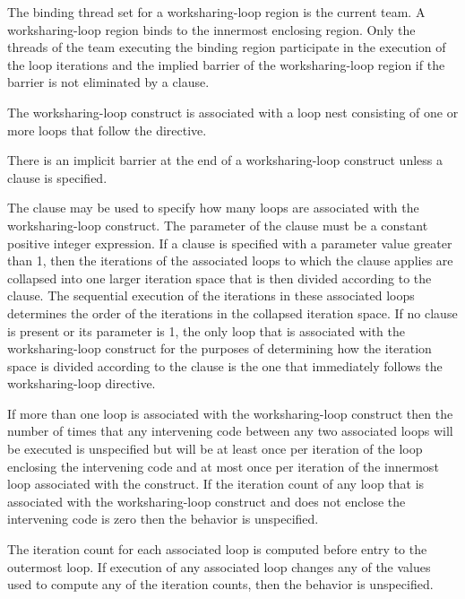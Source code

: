 \binding
The binding thread set for a worksharing-loop region is the current team. A
worksharing-loop region binds to the
innermost enclosing  region. Only the threads of the team executing the
binding  region participate in the execution of the loop iterations and the
implied barrier of the worksharing-loop region if the barrier is not eliminated by a  clause.

\descr
The worksharing-loop construct is associated with a loop nest consisting of one or more loops that
follow the directive.

There is an implicit barrier at the end of a worksharing-loop construct unless a  clause is
specified.

The  clause may be used to specify how many loops are
associated with the worksharing-loop construct. The parameter of the 
clause must be a constant positive integer expression. If a 
clause is specified with a parameter value greater than 1, then the
iterations of the associated loops to which the clause applies are collapsed
into one larger iteration space that is then divided according
to the  clause. The sequential execution of the iterations
in these associated loops determines the order of the iterations in the
collapsed iteration space. If no  clause is present or its
parameter is 1, the only loop that is associated with the worksharing-loop construct
for the purposes of determining how the iteration space is divided according
to the  clause is the one that immediately follows the
worksharing-loop directive.

If more than one loop is associated with the worksharing-loop construct then the
number of times that any intervening code between any two associated
loops will be executed is unspecified but will be at least once per
iteration of the loop enclosing the intervening code and at most once
per iteration of the innermost loop associated with the construct. If the
iteration count of any loop that is associated with the worksharing-loop construct and does not
enclose the intervening code is zero then the behavior is unspecified.

The iteration count for each associated loop is computed before entry to the
outermost loop. If execution of any associated loop changes any of the values
used to compute any of the iteration counts, then the behavior is unspecified.

